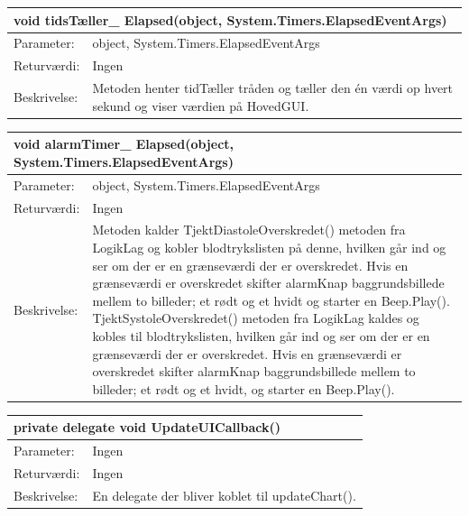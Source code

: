 \begin{table}[H]
\label{tab:tabel2}
\begin{tabular}{| l | p{13cm} |}
   \hline
   \multicolumn{2}{|l|}{void tidsTæller\_ Elapsed(object, System.Timers.ElapsedEventArgs)} \\ \hline
   Parameter: & object, System.Timers.ElapsedEventArgs\\ \hline
   Returværdi: & Ingen \\ \hline
   Beskrivelse: & Metoden henter tidTæller tråden og tæller den én værdi op hvert sekund og viser værdien på HovedGUI.\\ \hline
\end{tabular}
\end{table}
\begin{table}[H]
\label{tab:tabel2}
\begin{tabular}{| l | p{13cm} |}
   \hline
   \multicolumn{2}{|l|}{void alarmTimer\_ Elapsed(object, System.Timers.ElapsedEventArgs)} \\ \hline
   Parameter: & object, System.Timers.ElapsedEventArgs\\ \hline
   Returværdi: & Ingen \\ \hline
   Beskrivelse: & Metoden kalder TjektDiastoleOverskredet() metoden fra LogikLag og kobler blodtrykslisten på denne, hvilken går ind og ser om der er en grænseværdi der er overskredet. Hvis en grænseværdi er overskredet skifter alarmKnap baggrundsbillede mellem to billeder; et rødt og et hvidt og starter en Beep.Play(). TjektSystoleOverskredet() metoden fra LogikLag kaldes og kobles til blodtrykslisten, hvilken går ind og ser om der er en grænseværdi der er overskredet. Hvis en grænseværdi er overskredet skifter alarmKnap baggrundsbillede mellem to billeder; et rødt og et hvidt, og starter en Beep.Play().\\ \hline
\end{tabular}
\end{table}
\begin{table}[H]
\label{tab:tabel2}
\begin{tabular}{| l | p{13cm} |}
   \hline
   \multicolumn{2}{|l|}{private delegate void UpdateUICallback()} \\ \hline
   Parameter: & Ingen\\ \hline
   Returværdi: & Ingen \\ \hline
   Beskrivelse: & En delegate der bliver koblet til updateChart().\\ \hline
\end{tabular}
\end{table}
